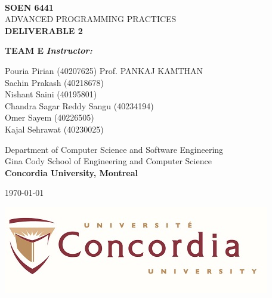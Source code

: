 \begin{titlepage}
    \begin{center}
        \textbf{\Large\\ SOEN 6441}
        \vspace{1cm}
        \Huge\\ ADVANCED PROGRAMMING PRACTICES
        \vspace{1cm}
        \textbf{\Huge\\DELIVERABLE 2}\\
        \vspace{2cm}
    
        \Large \textbf{TEAM E} \hfill  \textit{\textbf{Instructor:}}\\
        \begin{large}
            \begin{flushleft}
                \vspace{.1cm}
                Pouria Pirian (40207625) \hfill Prof. PANKAJ KAMTHAN\\
                Sachin Prakash (40218678)\\
                Nishant	Saini (40195801)\\
                Chandra Sagar Reddy	Sangu (40234194)\\
                Omer Sayem (40226505)\\
                Kajal Sehrawat (40230025)\\
            \end{flushleft}
        \end{large}
    
        \begin{Large}  
            \vspace{1 cm}
            Department of Computer Science and Software Engineering \\
            Gina Cody School of Engineering and Computer Science \\
            \textbf{Concordia University, Montreal}\\
            \vspace{1 cm}
    
            \today \\
        \end{Large}
    \end{center}
  
    \vfill
    \begin{center}
      \includegraphics[width = 50ex]{resources/concordia_med.jpg}
    \end{center}    
\end{titlepage}